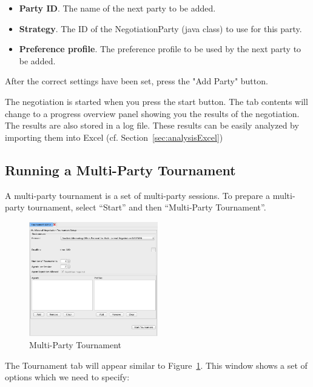 \documentclass[]{article}
\begin{document}
\medskip
\begin{minipage}{.8 \textwidth}
\begin{itemize}
	\item \textbf{Party ID}. The name of the next party to be added.
	\item \textbf{Strategy}. The ID of the NegotiationParty (java class) to use for this party.
	\item \textbf{Preference profile}. The preference profile to be used by the next party to be added.
\end{itemize}
\end{minipage}
\medskip

After the correct settings have been set, press the "Add Party" button.

The negotiation is started when you press the start button. The tab contents will change to  a progress overview panel
showing you the results of the negotiation. The results are also stored in a log file.
 These results can be easily analyzed by importing them into Excel (cf. Section~\ref{sec:analysisExcel})









\subsection{Running a Multi-Party Tournament}
A multi-party tournament is a set of multi-party sessions. To prepare a multi-party tournament, select  ``Start'' and then ``Multi-Party Tournament''. 

\begin{figure}[htb]
	\centering
	\includegraphics[width=0.5\textwidth]{media/multipartytournament.png}
\caption{Multi-Party Tournament}\label{Fig:multipartytournament}
\end{figure}

The Tournament tab will appear similar to Figure~\ref{Fig:multipartytournament}. This window shows a set of options which we need to specify:
\end{document}
